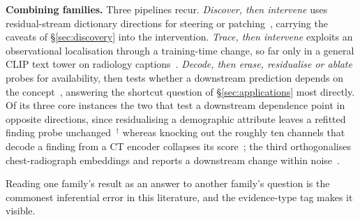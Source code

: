 \textbf{Combining families.} Three pipelines recur. \emph{Discover, then intervene} uses residual-stream
dictionary directions for steering or
patching~\cite{bouzid2025insights,nooralahzadeh2026universal,sadanandan2026mechanistically}, carrying the
caveats of \S\ref{sec:discovery} into the intervention. \emph{Trace, then intervene} exploits an
observational localisation through a training-time change, so far only in a general CLIP text tower on
radiology captions~\cite{abbasi2026layerspecific}. \emph{Decode, then erase, residualise or ablate} probes
for availability, then tests whether a downstream prediction depends on the
concept~\cite{kim2026encoding,nooralahzadeh2026sparse,weber2023posthoc}, answering the shortcut question of
\S\ref{sec:applications} most directly. Of its three core instances the two that test a downstream
dependence point in opposite directions, since
residualising a demographic attribute leaves a refitted finding probe unchanged~\cite{kim2026encoding}$^{\dagger}$
whereas knocking out the roughly ten channels that decode a finding from a CT encoder collapses its
score~\cite{nooralahzadeh2026sparse}; the third orthogonalises chest-radiograph embeddings and reports a
downstream change within noise~\cite{weber2023posthoc}.

Reading one family's result as an answer to another family's question is the commonest inferential error in
this literature, and the evidence-type tag makes it visible.

